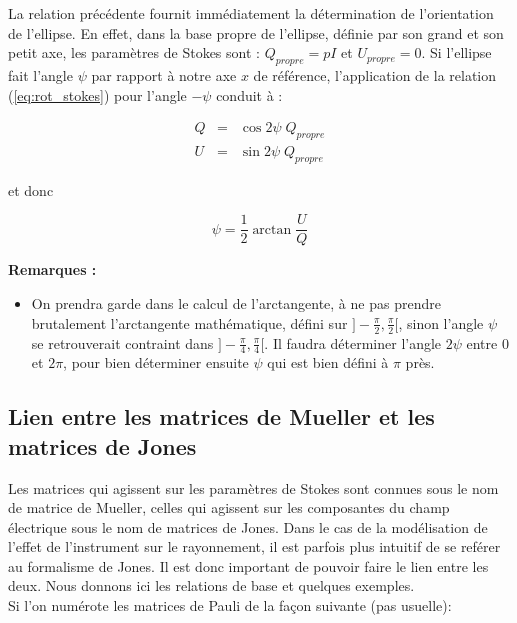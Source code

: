 \documentclass[a4paper,10pt]{article}
\begin{document}
La relation pr\'ec\'edente fournit imm\'ediatement la
d\'etermination de l'orientation de l'ellipse. En effet, dans la
base propre de l'ellipse, d\'efinie par son grand et son petit
axe, les param\`etres de Stokes sont : $Q_{propre} = pI$ et
$U_{propre}=0$. Si l'ellipse fait l'angle $\psi$ par rapport \`a
notre axe $x$ de r\'ef\'erence, l'application de la relation
(\ref{eq:rot_stokes}) pour l'angle $-\psi$ conduit \`a :

\begin{eqnarray}
Q & = & \cos2\psi \;Q_{propre} \label{eq:q_propre}\\
U & = & \sin2\psi \;Q_{propre} \label{eq:u_propre}
\end{eqnarray}

et donc

\begin{equation}
\psi =  \frac{1}{2}\arctan\frac{U}{Q}
\end{equation}

\textbf{Remarques :}

\begin{itemize}
\item On prendra garde dans le calcul de l'arctangente, \`a ne pas
prendre brutalement l'arctangente math\'ematique, d\'efini sur
$]-\frac{\pi}{2}, \frac{\pi}{2}[$, sinon l'angle $\psi$ se
retrouverait contraint dans $]-\frac{\pi}{4}, \frac{\pi}{4}[$. Il
faudra d\'eterminer l'angle $2\psi$ entre 0 et $2\pi$, pour bien
d\'eterminer ensuite $\psi$ qui est bien d\'efini \`a $\pi$
pr\`es.
\end{itemize}

\subsection{Lien entre les matrices de Mueller et les matrices de
Jones}
\label{se:jones2mueller}

Les matrices qui agissent sur les param\`etres de Stokes sont connues
sous le nom de matrice de Mueller, celles qui agissent sur les
composantes du champ \'electrique sous le nom de matrices de
Jones. Dans le cas de la mod\'elisation de l'effet de l'instrument sur
le rayonnement, il est parfois plus intuitif de se ref\'erer au
formalisme de Jones. Il est donc important de pouvoir faire le lien
entre les deux. Nous donnons ici les relations de base et quelques
exemples.\\

Si l'on num\'erote les matrices de Pauli de la fa\c con suivante (pas
usuelle):
\end{document}
